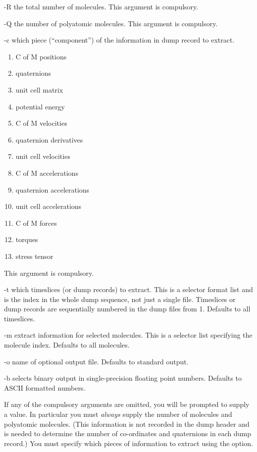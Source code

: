 \documentclass[a4paper,twoside]{report}
\begin{document}
\begin{Argdescription}
\item[-R] the total number of molecules.  This argument is compulsory.
\item[-Q] the number of polyatomic molecules.  This argument is compulsory.
\item[-c] which piece (``component'') of the information in dump
record to extract.  
\begin{enumerate}
\itemsep=0pt
\parskip=0pt
\item C of M positions
\item quaternions
\item unit cell matrix
\item potential energy
\item C of M velocities
\item quaternion derivatives
\item unit cell velocities
\item C of M accelerations
\item quaternion accelerations
\item unit cell accelerations
\item C of M forces
\item torques
\item stress tensor
\end{enumerate}
This argument is compulsory.
\item[-t] which timeslices (or dump records) to extract.  This is a
selector format list and is the index in the whole dump sequence, not
just a single file.  Timeslices or dump records are sequentially
numbered in the dump files from 1.  Defaults to all timeslices.
\item[-m] extract information for selected molecules.  This is a
selector list specifying the molecule index.  Defaults to all
molecules.
\item[-o] name of optional output file.  Defaults to standard output.
\item[-b] selects binary output in single-precision floating point
numbers. Defaults to ASCII formatted numbers.
\end{Argdescription}
If any of the compulsory arguments are omitted, you will be prompted
to supply a value.  In particular you must \emph{always} supply the
number of molecules and polyatomic molecules.  (This information is
not recorded in the dump header and is needed to determine the number
of co-ordinates and quaternions in each dump record.)  You must
specify which pieces of information to extract using the 
option.
\end{document}
